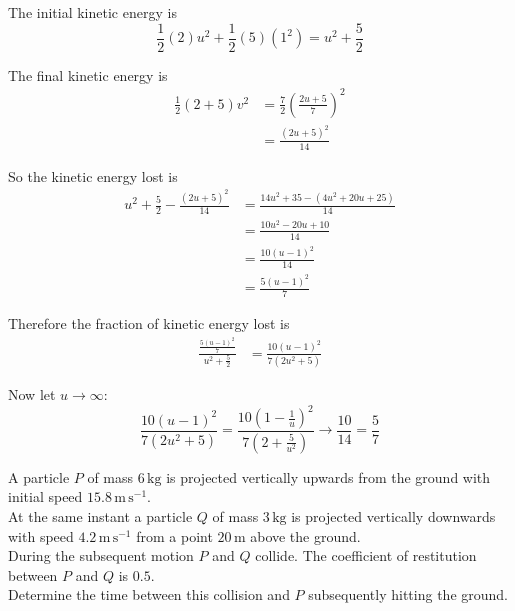 \documentclass[leqno]{article}
\begin{document}
\begin{enumerate}[
  label=\textbf{\arabic*.},
  leftmargin=*,
  topsep=0pt,
  partopsep=0pt,
  parsep=0pt
]
\begin{djsSolution}
\begin{enumerate}[label=\textbf{(\alph*)}]
  The initial kinetic energy is
  \[
  \frac12(2)u^2+\frac12(5)(1^2)=u^2+\frac52
  \]

  The final kinetic energy is
  \begin{align*}
  \frac12(2+5)v^2
  &=\frac72\left(\frac{2u+5}{7}\right)^2\\
  &=\frac{(2u+5)^2}{14}
  \end{align*}

  So the kinetic energy lost is
  \begin{align*}
  u^2+\frac52-\frac{(2u+5)^2}{14}
  &=\frac{14u^2+35-(4u^2+20u+25)}{14}\\
  &=\frac{10u^2-20u+10}{14}\\
  &=\frac{10(u-1)^2}{14}\\
  &=\frac{5(u-1)^2}{7}
  \end{align*}

  Therefore the fraction of kinetic energy lost is
  \begin{align*}
  \frac{\frac{5(u-1)^2}{7}}{u^2+\frac52}
  &=\frac{10(u-1)^2}{7(2u^2+5)}
  \end{align*}

  Now let $u\to\infty$:
  \[
  \frac{10(u-1)^2}{7(2u^2+5)}
  =\frac{10\left(1-\frac1u\right)^2}{7\left(2+\frac{5}{u^2}\right)}
  \to \frac{10}{14}=\frac57
  \]

\end{enumerate}
\end{djsSolution}


\newpage

\questionitem

A particle $P$ of mass $6\,\mathrm{kg}$ is projected vertically upwards from the ground with initial speed $15.8\,\mathrm{m\,s}^{-1}$. \\

At the same instant a particle $Q$ of mass $3\,\mathrm{kg}$ is projected vertically downwards with speed $4.2\,\mathrm{m\,s}^{-1}$ from a point $20\,\mathrm{m}$ above the ground. \\

During the subsequent motion $P$ and $Q$ collide. The coefficient of restitution between $P$ and $Q$ is $0.5$. \\

Determine the time between this collision and $P$ subsequently hitting the ground. 

\vspace*{10pt}


\end{enumerate}
\end{document}
